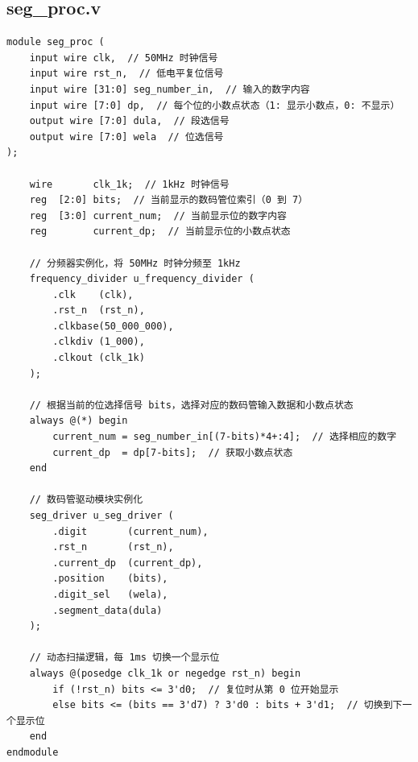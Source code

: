 \documentclass[a4paper,10pt]{article}
\begin{document}
\subsection{seg_proc.v}
\begin{lstlisting}[caption=seg_proc.v]
module seg_proc (
    input wire clk,  // 50MHz 时钟信号
    input wire rst_n,  // 低电平复位信号
    input wire [31:0] seg_number_in,  // 输入的数字内容
    input wire [7:0] dp,  // 每个位的小数点状态（1: 显示小数点，0: 不显示）
    output wire [7:0] dula,  // 段选信号
    output wire [7:0] wela  // 位选信号
);

    wire       clk_1k;  // 1kHz 时钟信号
    reg  [2:0] bits;  // 当前显示的数码管位索引（0 到 7）
    reg  [3:0] current_num;  // 当前显示位的数字内容
    reg        current_dp;  // 当前显示位的小数点状态

    // 分频器实例化，将 50MHz 时钟分频至 1kHz
    frequency_divider u_frequency_divider (
        .clk    (clk),
        .rst_n  (rst_n),
        .clkbase(50_000_000),
        .clkdiv (1_000),
        .clkout (clk_1k)
    );

    // 根据当前的位选择信号 bits，选择对应的数码管输入数据和小数点状态
    always @(*) begin
        current_num = seg_number_in[(7-bits)*4+:4];  // 选择相应的数字
        current_dp  = dp[7-bits];  // 获取小数点状态
    end

    // 数码管驱动模块实例化
    seg_driver u_seg_driver (
        .digit       (current_num),
        .rst_n       (rst_n),
        .current_dp  (current_dp),
        .position    (bits),
        .digit_sel   (wela),
        .segment_data(dula)
    );

    // 动态扫描逻辑，每 1ms 切换一个显示位
    always @(posedge clk_1k or negedge rst_n) begin
        if (!rst_n) bits <= 3'd0;  // 复位时从第 0 位开始显示
        else bits <= (bits == 3'd7) ? 3'd0 : bits + 3'd1;  // 切换到下一个显示位
    end
endmodule

\end{lstlisting}
\end{document}
